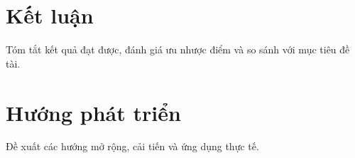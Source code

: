 \section{Kết luận}
Tóm tắt kết quả đạt được, đánh giá ưu nhược điểm và so sánh với mục tiêu đề tài.

\section{Hướng phát triển}
Đề xuất các hướng mở rộng, cải tiến và ứng dụng thực tế.